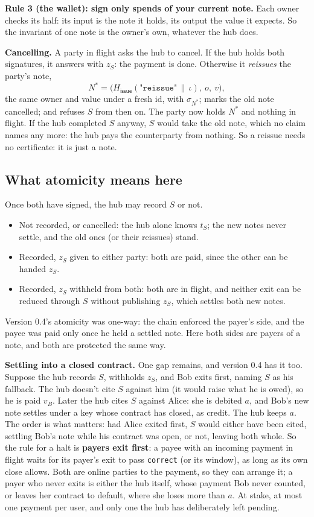 \documentclass[11pt]{article}
\theoremstyle{plain}
\theoremstyle{definition}
\newcommand{\tx}[1]{\texttt{#1}}
\newcommand{\Ht}[1]{H_{\textsf{#1}}}
\begin{document}
\textbf{Rule 3 (the wallet): sign only spends of your current note.}
Each owner checks its half: its input is the note it holds, its output
the value it expects. So the invariant of one note is the owner's own,
whatever the hub does.

\textbf{Cancelling.} A party in flight asks the hub to cancel. If the
hub holds both signatures, it answers with $z_S$: the payment is done.
Otherwise it \emph{reissues} the party's note,
\[
  N^{*} = \big(\Ht{issue}(\texttt{"reissue"} \,\|\, \iota),\ o,\ v\big),
\]
the same owner and value under a fresh id, with $\sigma_{N^*}$; marks the old note
cancelled; and refuses $S$ from then on. The party now holds $N^*$ and
nothing in flight. If the hub completed $S$ anyway, $S$ would take the
old note, which no claim names any more: the hub pays the counterparty
from nothing. So a reissue needs no certificate: it is just a note.

\subsection{What atomicity means here}\label{sec:atomic}

Once both have signed, the hub may record $S$ or not.
\begin{itemize}[nosep]
\item Not recorded, or cancelled: the hub alone knows $t_S$; the new
  notes never settle, and the old ones (or their reissues) stand.
\item Recorded, $z_S$ given to either party: both are paid, since the
  other can be handed $z_S$.
\item Recorded, $z_S$ withheld from both: both are in flight, and
  neither exit can be reduced through $S$ without publishing $z_S$,
  which settles both new notes.
\end{itemize}
Version 0.4's atomicity was one-way: the chain enforced the payer's
side, and the payee was paid only once he held a settled note. Here
both sides are payers of a note, and both are protected the same way.

\textbf{Settling into a closed contract.} One gap remains, and version
0.4 has it too. Suppose the hub records $S$, withholds $z_S$, and Bob
exits first, naming $S$ as his fallback. The hub doesn't cite $S$
against him (it would raise what he is owed), so he is paid $v_B$.
Later the hub cites $S$ against Alice: she is debited $a$, and Bob's new
note settles under a key whose contract has closed, as credit. The hub
keeps $a$. The order is what matters: had Alice exited first, $S$ would
either have been cited, settling Bob's note while his contract was
open, or not, leaving both whole. So the rule for a halt is
\textbf{payers exit first}: a payee with an incoming payment in flight
waits for its payer's exit to pass \tx{correct} (or its window), as
long as its own close allows.
Both are online parties to the payment, so they can arrange it; a payer
who never exits is either the hub itself, whose payment Bob never
counted, or leaves her contract to default, where she loses more than
$a$. At stake, at most one payment per user, and only one the hub has
deliberately left pending.
\end{document}
